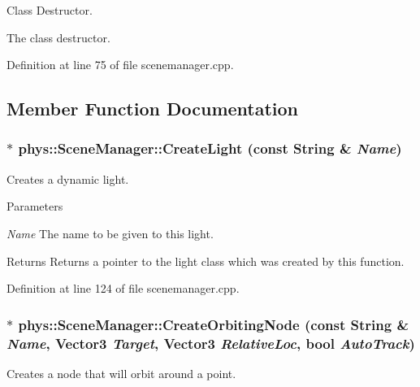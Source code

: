 Class Destructor. 

The class destructor. 

Definition at line 75 of file scenemanager.cpp.



\subsection{Member Function Documentation}
\hypertarget{classphys_1_1SceneManager_aaf14df62a5d6c55c3307d154a0caf5ea}{
\subsubsection[{CreateLight}]{ $\ast$ phys::SceneManager::CreateLight (const {\bf String} \& {\em Name})}}
\label{dd/da8/classphys_1_1SceneManager_aaf14df62a5d6c55c3307d154a0caf5ea}


Creates a dynamic light. 


\begin{DoxyParams}{Parameters}
\item[{\em Name}]The name to be given to this light. \end{DoxyParams}
\begin{DoxyReturn}{Returns}
Returns a pointer to the light class which was created by this function. 
\end{DoxyReturn}


Definition at line 124 of file scenemanager.cpp.

\hypertarget{classphys_1_1SceneManager_a8cbdbb737592fe10fb7f82e0eabf7085}{
\subsubsection[{CreateOrbitingNode}]{ $\ast$ phys::SceneManager::CreateOrbitingNode (const {\bf String} \& {\em Name}, \/  {\bf Vector3} {\em Target}, \/  {\bf Vector3} {\em RelativeLoc}, \/  bool {\em AutoTrack})}}
\label{dd/da8/classphys_1_1SceneManager_a8cbdbb737592fe10fb7f82e0eabf7085}


Creates a node that will orbit around a point. 

